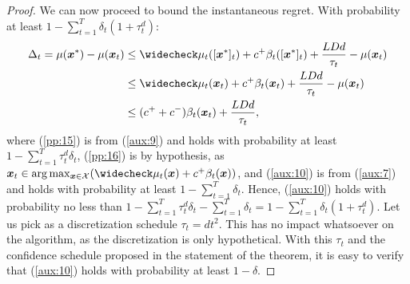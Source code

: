 \documentclass{article}
\begin{document}
\begin{proof}
	We can now proceed to bound the instantaneous regret. With probability at least $1-\sum_{t=1}^T\delta_t(1+\tau_t^d)$:
	\begin{align}
	\Delta_t = \mu(\vx^*) - \mu(\vx_t) &\leq 
	\wc{\mu_t}([\vx^*]_t) + c^{+}\beta_t([\vx^*]_t) + \frac{LDd}{\tau_t} - \mu(\vx_t) \label{pp:15}\\
	&\leq \wc{\mu_t}(\vx_t) + c^{+}\beta_t(\vx_t) + \frac{LDd}{\tau_t} - \mu(\vx_t) \label{pp:16}\\
		&\leq (c^{+}+c^{-})\beta_t(\vx_t) + \frac{LDd}{\tau_t}, \label{aux:10}
	\end{align}
	where (\ref{pp:15}) is from (\ref{aux:9}) and holds with probability at least $1-\sum_{t=1}^{T}\tau_t^d\delta_t$, (\ref{pp:16}) is by hypothesis, as $\vx_t\in\arg\max_{\vx\in\Xspace}(\wc{\mu_t}(\vx) + c^{+}\beta_t(\vx))$, and (\ref{aux:10}) is from (\ref{aux:7}) and holds with probability at least $1-\sum_{t=1}^{T}\delta_t$. Hence, (\ref{aux:10}) holds with probability no less than $1-\sum_{t=1}^{T}\tau_t^d\delta_t - \sum_{t=1}^{T}\delta_t = 1 - \sum_{t=1}^T\delta_t(1+\tau_t^d)$. Let us pick as a discretization schedule $\tau_t = dt^2$. This has no impact whatsoever on the algorithm, as the discretization is only hypothetical. With this $\tau_t$ and the confidence schedule proposed in the statement of the theorem, it is easy to verify that (\ref{aux:10}) holds with probability at least $1-\delta$.
	

\end{proof}
\end{document}
